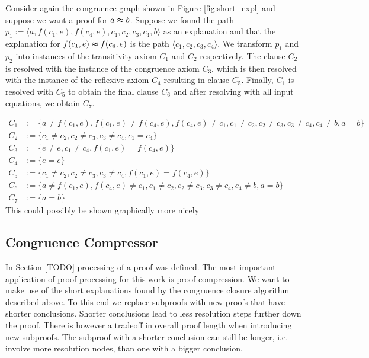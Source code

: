 \begin{example}

Consider again the congruence graph shown in Figure \ref{fig:short_expl} and suppose we want a proof for $a \thickapprox b$.
Suppose we found the path $p_1 := \langle  a, f(c_1,e), f(c_4,e), c_1, c_2, c_3, c_4, b \rangle$ as an explanation and that the explanation for $f(c_1,e) \thickapprox f(c_4,e)$ is the path $\langle c_1, c_2, c_3, c_4 \rangle$.
We transform $p_1$ and $p_2$ into instances of the transitivity axiom $C_1$ and $C_2$ respectively. 
The clause $C_2$ is resolved with the instance of the congruence axiom $C_3$, which is then resolved with the instance of the reflexive axiom $C_4$ resulting in clause $C_5$.
Finally, $C_1$ is resolved with $C_5$ to obtain the final clause $C_6$ and after resolving with all input equations, we obtain $C_7$.

\begin{align*}
C_1 &:= \{a \neq f(c_1,e), f(c_1,e) \neq f(c_4,e), f(c_4,e) \neq c_1, c_1 \neq c_2, c_2 \neq c_3, c_3 \neq c_4, c_4 \neq b, a = b\} \\
C_2 &:= \{c_1 \neq c_2, c_2 \neq c_3, c_3 \neq c_4, c_1 = c_4\} \\
C_3 &:= \{e \neq e, c_1 \neq c_4, f(c_1,e) = f(c_4,e)\} \\
C_4 &:= \{e = e\} \\
C_5 &:= \{c_1 \neq c_2, c_2 \neq c_3, c_3 \neq c_4, f(c_1,e) = f(c_4,e)\} \\
C_6 &:= \{a \neq f(c_1,e), f(c_4,e) \neq c_1, c_1 \neq c_2, c_2 \neq c_3, c_3 \neq c_4, c_4 \neq b, a = b\} \\
C_7 &:= \{a = b\} 
\end{align*}
{\color{blue} This could possibly be shown graphically more nicely}
\end{example}

\FloatBarrier

\subsection*{Congruence Compressor}

In Section \ref{TODO} processing of a proof was defined.
The most important application of proof processing for this work is proof compression.
We want to make use of the short explanations found by the congruence closure algorithm described above.
To this end we replace subproofs with new proofs that have shorter conclusions.
Shorter conclusions lead to less resolution steps further down the proof.
There is however a tradeoff in overall proof length when introducing new subproofs.
The subproof with a shorter conclusion can still be longer, i.e. involve more resolution nodes, than one with a bigger conclusion.

